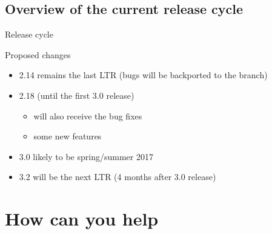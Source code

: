 \subsection{Overview of the current release cycle}
\begin{frame}{Release cycle}
\end{frame}

\begin{frame}{Proposed changes}
	\begin{block}{}
		\begin{itemize}
			\item 2.14 remains the last LTR (bugs will be backported to the branch)
			\item 2.18 (until the first 3.0 release)
				\begin{itemize}
					\item will also receive the bug fixes
					\item some new features 
				\end{itemize}
			\item 3.0 likely to be spring/summer 2017
			\item 3.2 will be the next LTR (4 months after 3.0 release)
		\end{itemize}
	\end{block}
\end{frame}

\section{How can you help}

